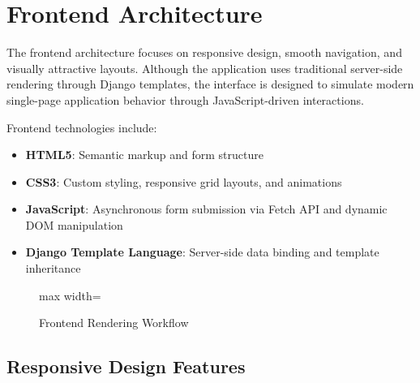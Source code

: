 \section{Frontend Architecture}

The frontend architecture focuses on responsive design, smooth navigation, and visually attractive layouts. Although the application uses traditional server-side rendering through Django templates, the interface is designed to simulate modern single-page application behavior through JavaScript-driven interactions.

Frontend technologies include:

\begin{itemize}
    \item \textbf{HTML5}: Semantic markup and form structure
    \item \textbf{CSS3}: Custom styling, responsive grid layouts, and animations
    \item \textbf{JavaScript}: Asynchronous form submission via Fetch API and dynamic DOM manipulation
    \item \textbf{Django Template Language}: Server-side data binding and template inheritance
\end{itemize}

\begin{figure}[H]
    \centering
    \begin{adjustbox}{max width=\textwidth}
    \end{adjustbox}
    \caption{Frontend Rendering Workflow}
    \label{fig:frontend-workflow}
\end{figure}

\subsection{Responsive Design Features}


